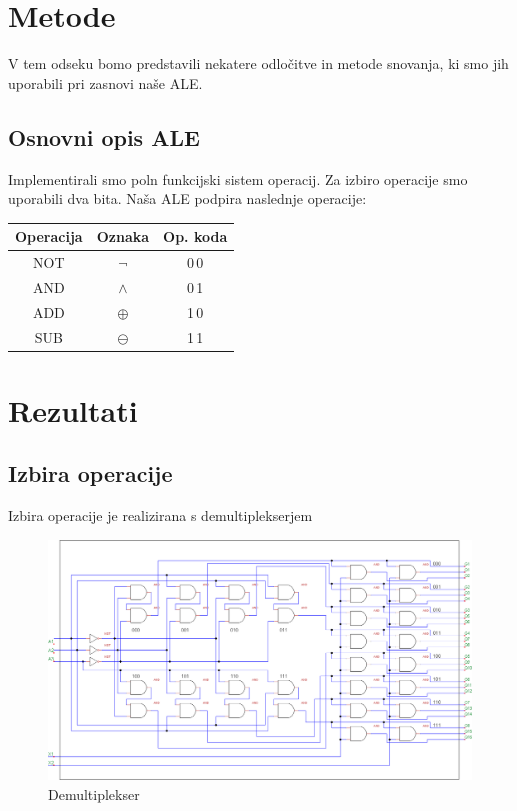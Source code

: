 \documentclass[seminar, slovene]{FRIreport}
\begin{document}
%
\section{Metode}
V tem odseku bomo predstavili nekatere odločitve in metode snovanja, ki smo jih uporabili pri zasnovi naše ALE.

\subsection{Osnovni opis ALE}
Implementirali smo poln funkcijski sistem operacij. Za izbiro operacije smo uporabili dva bita. Naša ALE podpira naslednje operacije:\\
\begin{center}
\begin{tabular}{ | c | c | c | }\hline
\textbf{Operacija} & \textbf{Oznaka} & \textbf{Op. koda} \\ \hline
NOT & $\lnot$ & 0\,0 \\
AND & $\wedge$ & 0\,1 \\
ADD & $\oplus$ & 1\,0 \\
SUB & $\ominus$ & 1\,1 \\ \hline
\end{tabular}
\end{center}

%
\section{Rezultati}
\subsection{Izbira operacije}
Izbira operacije je realizirana s demultiplekserjem
\begin{figure}[htb]
\includegraphics[width=15cm]{vezja/img/demux.png}
\caption{Demultiplekser}
\label{demux}
\end{figure}
\pagebreak
\end{document}

